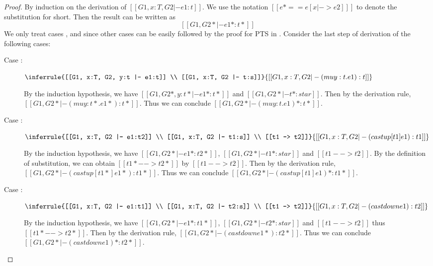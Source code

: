 \begin{proof}
    By induction on the derivation of $[[G1, x:T, G2 |- e1:t]]$. We use the notation $[[e* == e
[x |-> e2] ]]$ to denote the substitution for short. Then the result can be written as \[ [[G1, G2* |- e1*  : t* ]]\]
We only treat cases ,  and
 since other cases can be easily followed by the proof for PTS in .
Consider the last step of derivation of the following
cases:
    \begin{description}
        \item[Case :] $\inferrule{[[G1, x:T, G2, y:t |- e1:t]] \\
[[G1, x:T, G2 |- t:s]]}{[[G1, x:T, G2 |- (mu y:t.e1): t]]}$ 
        
        By the induction hypothesis, we have $[[G1, G2*, y:t* |- e1* : t*]]$ and $[[G1,
G2* |- t* : star]]$. Then by the derivation rule, $[[G1, G2* |- (mu
y:t*.e1*):t*]]$. Thus we can conclude $[[G1, G2* |- (mu y:t.e1)*:t*]]$.
        \item[Case :] $\inferrule{[[G1, x:T, G2 |- e1:t2]]
\\ [[G1, x:T, G2 |- t1:s]] \\ [[t1 --> t2]]}{[[G1, x:T, G2 |- (castup [t1]
e1):t1]]}$ 
        
        By the induction hypothesis, we have $[[G1, G2* |- e1*:t2*]]$, $[[G1, G2*
|- t1*:star]]$ and $[[t1 --> t2]]$. By the definition of substitution, we can
obtain $[[t1* --> t2*]]$ by $[[t1 --> t2]]$. Then by the derivation rule, $[[G1,
G2* |- (castup [t1*] e1*):t1*]]$. Thus we can conclude $[[G1, G2* |- (castup [t1]
e1)*:t1*]]$.
        \item[Case :] $\inferrule{[[G1, x:T, G2 |- e1:t1]]
\\ [[G1, x:T, G2 |- t2:s]] \\ [[t1 --> t2]]}{[[G1, x:T, G2 |- (castdown
e1):t2]]}$ 
        
        By the induction hypothesis, we have $[[G1, G2* |- e1*:t1*]]$, $[[G1, G2*
|- t2*:star]]$ and $[[t1 --> t2]]$ thus $[[t1* --> t2*]]$. Then by the
derivation rule, $[[G1, G2* |- (castdown e1*):t2*]]$. Thus we can conclude $[[G1, G2* |-
(castdown e1)*:t2*]]$.
    \end{description}
\end{proof}

